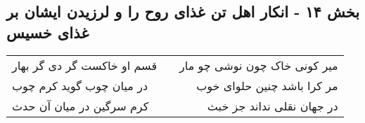 \begin{center}
\section*{بخش ۱۴ - انکار اهل تن غذای روح را و لرزیدن ایشان بر غذای خسیس}
\label{sec:sh014}
\begin{longtable}{l p{0.5cm} r}
قسم او خاکست گر دی گر بهار
&&
میر کونی خاک چون نوشی چو مار
\\
در میان چوب گوید کرم چوب
&&
مر کرا باشد چنین حلوای خوب
\\
کرم سرگین در میان آن حدث
&&
در جهان نقلی نداند جز خبث
\\
\end{longtable}
\end{center}
